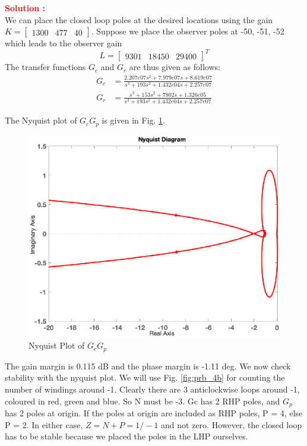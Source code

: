 \documentclass[12pt]{article}
\newcommand{\bmat}[1]{\begin{bmatrix} #1 \end{bmatrix}}
\begin{document}
\textbf{\textcolor{red}{Solution :}} \\
We can place the closed loop poles at the desired locations using the gain $K =\bmat{1300 & 477 & 40}$. Suppose we place the observer poles at -50, -51, -52 which leads to the observer gain  $$L =\bmat{ 9301 & 18450 & 29400}^T $$ The transfer functions $G_c$ and $G_r$ are thus given as follows:
\begin{align*}
    G_c &=\frac{2.207e07 s^2 + 7.979e07 s + 8.619e07}{s^3 + 193s^2 + 1.432e04s + 2.257e07} \\
    G_r &= \frac{s^3 + 153s^2 + 7802s + 1.326e05}{s^3 + 193s^2 + 1.432e04s + 2.257e07}
\end{align*}

The Nyquist plot of $G_cG_p$ is given in Fig. \ref{fig:prb_4a}. 
\begin{figure}[H]
    \centering
    \includegraphics[scale=0.6]{figs/8.2-1.eps}
    \caption{Nyquist Plot of $G_cG_p$}
    \label{fig:prb_4a}
\end{figure}

 The gain margin is 0.115 dB and the phase margin is -1.11 deg. We now check stability with the nyquist plot. We will use Fig. \ref{fig:prb_4b} for counting the number of windings around -1. Clearly there are 3 anticlockwise loops around -1, coloured in red, green and blue. So N must be -3. Gc has 2 RHP poles, and $G_p$ has 2 poles at origin. If the poles at origin are included as RHP poles, P = 4, else P = 2. In either case, $Z = N + P = 1/ -1$ and not zero. However, the closed loop has to be stable because we placed the poles in the LHP ourselves. 
\end{document}
